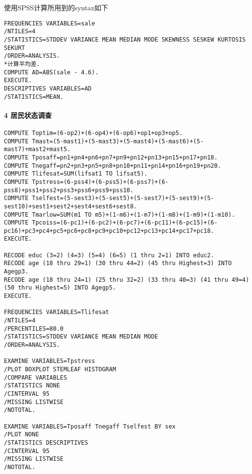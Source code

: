 \documentclass[UTF8]{ctexart}
\begin{document}
\noindent
使用SPSS计算所用到的syntax如下
\begin{verbatim}
FREQUENCIES VARIABLES=sale 
/NTILES=4 
/STATISTICS=STDDEV VARIANCE MEAN MEDIAN MODE SKEWNESS SESKEW KURTOSIS SEKURT 
/ORDER=ANALYSIS.
*计算平均差.
COMPUTE AD=ABS(sale - 4.6). 
EXECUTE.  
DESCRIPTIVES VARIABLES=AD 
/STATISTICS=MEAN.
\end{verbatim}

\paragraph{4 居民状态调查}
\begin{verbatim}
COMPUTE Toptim=(6-op2)+(6-op4)+(6-op6)+op1+op3+op5.
COMPUTE Tmast=(5-mast1)+(5-mast3)+(5-mast4)+(5-mast6)+(5-mast7)+mast2+mast5.
COMPUTE Tposaff=pn1+pn4+pn6+pn7+pn9+pn12+pn13+pn15+pn17+pn18.
COMPUTE Tnegaff=pn2+pn3+pn5+pn8+pn10+pn11+pn14+pn16+pn19+pn20.
COMPUTE Tlifesat=SUM(lifsat1 TO lifsat5).
COMPUTE Tpstress=(6-pss4)+(6-pss5)+(6-pss7)+(6-pss8)+pss1+pss2+pss3+pss6+pss9+pss10.
COMPUTE Tselfest=(5-sest3)+(5-sest5)+(5-sest7)+(5-sest9)+(5-sest10)+sest1+sest2+sest4+sest6+sest8.
COMPUTE Tmarlow=SUM(m1 TO m5)+(1-m6)+(1-m7)+(1-m8)+(1-m9)+(1-m10).
COMPUTE Tpcoiss=(6-pc1)+(6-pc2)+(6-pc7)+(6-pc11)+(6-pc15)+(6-pc16)+pc3+pc4+pc5+pc6+pc8+pc9+pc10+pc12+pc13+pc14+pc17+pc18.
EXECUTE.

RECODE educ (3=2) (4=3) (5=4) (6=5) (1 thru 2=1) INTO educ2.
RECODE age (18 thru 29=1) (30 thru 44=2) (45 thru Highest=3) INTO Agegp3.
RECODE age (18 thru 24=1) (25 thru 32=2) (33 thru 40=3) (41 thru 49=4) (50 thru Highest=5) INTO Agegp5.
EXECUTE.

FREQUENCIES VARIABLES=Tlifesat
/NTILES=4
/PERCENTILES=80.0 
/STATISTICS=STDDEV VARIANCE MEAN MEDIAN MODE
/ORDER=ANALYSIS.

EXAMINE VARIABLES=Tpstress
/PLOT BOXPLOT STEMLEAF HISTOGRAM
/COMPARE VARIABLES
/STATISTICS NONE
/CINTERVAL 95
/MISSING LISTWISE
/NOTOTAL.

EXAMINE VARIABLES=Tposaff Tnegaff Tselfest BY sex
/PLOT NONE
/STATISTICS DESCRIPTIVES
/CINTERVAL 95
/MISSING LISTWISE
/NOTOTAL.
\end{verbatim}
\end{document}
